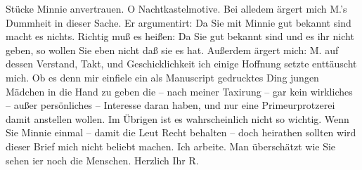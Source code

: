 \begin{ledgroupsized}[t]{13cm}
               Stücke Minnie anvertrauen. O
               Nachtkastelmotive. Bei alledem ärgert mich M.’s Dummheit in dieser Sache. Er argumentirt: Da Sie mit Minnie gut {\pb}bekannt sind macht es nichts. Richtig muß es heißen: Da Sie gut bekannt sind und es
               ihr nicht geben, so wollen Sie eben nicht daß sie es hat. Außerdem ärgert mich: M. auf dessen Verstand, Takt, und
               Geschicklichkeit ich einige Hoffnung setzte enttäuscht mich. Ob es denn mir einfiele
               ein als Manuscript gedrucktes Ding jungen Mädchen in die Hand zu geben die – nach meiner Taxirung –
               gar kein wirkliches – außer persönliches – Interesse daran haben, und nur eine
               Primeurprotzerei damit anstellen wollen. Im Übrigen ist es wahrscheinlich nicht so
               wichtig.\pend
           \pstart
           Wenn Sie Minnie einmal – damit die Leut Recht
               behalten – doch heirathen sollten wird dieser Brief mich nicht beliebt machen.\pend
           \pstart
           Ich arbeite. Man überschätzt wie Sie sehen i{\geminationm}er noch die
               Menschen. Herzlich Ihr \spacefill\mbox{R.}\pend
           
         
         \endnumbering{}\end{ledgroupsized}  \newcommand{\dateiname}{L01053}\newcommand{\titel}{Richard Beer-Hofmann an Arthur Schnitzler, 13. 7. 1900}\newcommand{\editorInnen}{Martin Anton Müller und Gerd-Hermann Susen}
      